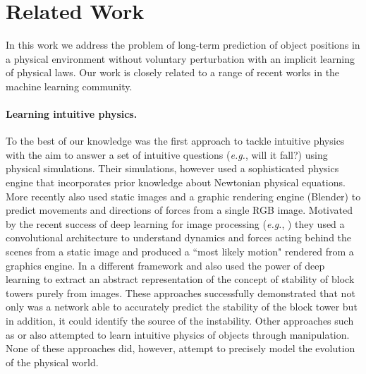 \section{Related Work}
\label{sec:related}

In this work we address the problem of long-term prediction of object positions in a physical environment without voluntary perturbation with an implicit learning of physical laws. Our work is  closely related to a range of recent works in the machine learning community.

\paragraph{Learning intuitive physics.}
To the best of our knowledge \cite{battaglia2013simulation} was the first approach to tackle intuitive physics with the aim to answer a set of intuitive questions (\textit{e.g.}, will it fall?) using physical simulations. Their simulations, however used a sophisticated physics engine that incorporates prior knowledge about Newtonian physical equations. More recently \cite{Mottaghi_2016_CVPR} also used static images and a graphic rendering engine (Blender) to predict movements and directions of forces from a single RGB image. Motivated by the recent success of deep learning for image processing (\textit{e.g.}, \cite{krizhevsky2012imagenet,he2016deep}) they used a convolutional architecture to understand dynamics and forces acting behind the scenes from a static image and produced a ``most likely motion" rendered from a graphics engine. In a different framework \cite{lerer2016learning} and \cite{li2016visual} also used the power of deep learning to extract an abstract representation of the concept of stability of block towers purely from images. These approaches successfully demonstrated that not only was a network able to accurately predict the stability of the block tower but in addition, it could identify the source of the instability. Other approaches such as \cite{NIPS2016_6113} or \cite{denil2016learning} also attempted to learn intuitive physics of objects through manipulation. None of these approaches did, however, attempt to precisely model the evolution of the physical world.


